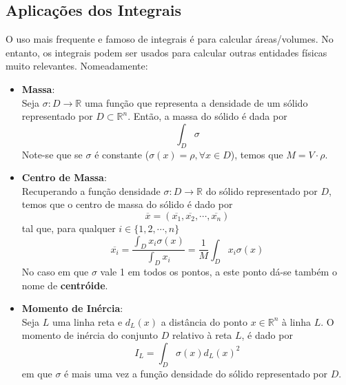 \documentclass{article}
\newcommand{\R}{\mathbb{R}}
\begin{document}
\subsection{Aplicações dos Integrais}
O uso mais frequente e famoso de integrais é para calcular áreas/volumes. No entanto, os integrais podem ser usados para calcular outras entidades físicas muito relevantes. Nomeadamente:
\begin{itemize}
	\item \textbf{Massa}:\\
Seja $\sigma: D \to \R$ uma função que representa a densidade de um sólido representado por $D \subset \R^n$. Então, a massa do sólido é dada por
$$
\int_D \sigma
$$
Note-se que se $\sigma$ é constante ($\sigma(x) = \rho, \forall x \in D$), temos que $M = V \cdot \rho$.
	\item \textbf{Centro de Massa}:\\
Recuperando a função densidade $\sigma: D \to \R$ do sólido representado por $D$, temos que o centro de massa do sólido é dado por
$$
\overline{x} = (\overline{x_1}, \overline{x_2}, \cdots, \overline{x_n})
$$
tal que, para qualquer $i \in \{1, 2, \cdots, n \}$
$$
\overline{x_i} = \frac{\int_D x_i \sigma(x)}{\int_D x_i} = \frac{1}{M} \int_D x_i \sigma(x)
$$
No caso em que $\sigma$ vale 1 em todos os pontos, a este ponto dá-se também o nome de \textbf{centróide}.
	\item \textbf{Momento de Inércia}:\\
Seja $L$ uma linha reta e $d_L(x)$ a distância do ponto $x \in \R^n$ à linha $L$. O momento de inércia do conjunto $D$ relativo à reta $L$, é dado por
$$
I_L = \int_D \sigma(x) d_L(x)^2
$$
em que $\sigma$ é mais uma vez a função densidade do sólido representado por $D$.
\end{itemize}
\end{document}

